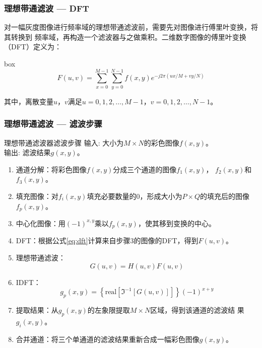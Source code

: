 \documentclass[xcolor=svgnames,serif,table]{beamer}
\begin{document}
\begin{frame}
  \frametitle{理想带通滤波 --- DFT}
  对一幅灰度图像进行频率域的理想带通滤波前，需要先对图像进行傅里叶变换，将其转换到
  频率域，再构造一个滤波器与之做乘积。二维数字图像的傅里叶变换（DFT）定义为：

  \medskip
  \begin{beamercolorbox}[shadow=true,sep=0pt,rounded=true]{box}
    \begin{equation}
      \label{eq:dft}
      F(u,v)=\sum_{x=0}^{M-1}\sum_{y=0}^{N-1}f(x,y)e^{-j2\pi(ux/M+vy/N)}
    \end{equation}
  \end{beamercolorbox}
  
  其中，离散变量$u$，$v$满足$u=0,1,2,\ldots,M-1$，$v=0,1,2,\ldots,N-1$。
\end{frame}

\begin{frame}
  \frametitle{理想带通滤波 --- 滤波步骤}
  \scriptsize
  \begin{exampleblock}{理想带通滤波器滤波步骤}
    \textcolor{black!60!green}{输入}: 大小为$M\times N$的彩色图像$f(x,y)$。\\
    \textcolor{black!60!green}{输出}: 滤波结果$g(x,y)$。\\ \vspace{-.5em}
    \begin{enumerate}[(S1)]
    \item 通道分解：将彩色图像$f(x,y)$分成三个通道的图像$f_1(x,y)$，
    $f_2(x,y)$和$f_3(x,y)$。
    \item 填充图像：对$f_i(x,y)$填充必要数量的0，形成大小为$P\times Q$的填充后的图像
    $f_{p}(x,y)$。
    \item 中心化图像：用$(-1)^{x,y}$乘以$f_{p}(x,y)$，使其移到变换的中心。
    \item DFT：根据公式\ref{eq:dft}计算来自步骤3的图像的DFT，得到$F(u,v)$。
    \item 理想带通滤波：$$G(u,v)=H(u,v)F(u,v)$$
    \item IDFT：$$g_p(x,y)=\left\{
      \mbox{real}[\Im^{-1}[G(u,v)]] \right\}(-1)^{x+y}$$ 
    \item 提取结果：从$g_p(x,y)$的左象限提取$M\times N$区域，得到该通道的滤波结
    果$g_i(x,y)$。
    \item 合并通道：将三个单通道的滤波结果重新合成一幅彩色图像$g(x,y)$。
    \end{enumerate}
  \end{exampleblock}
\end{frame}
\end{document}

